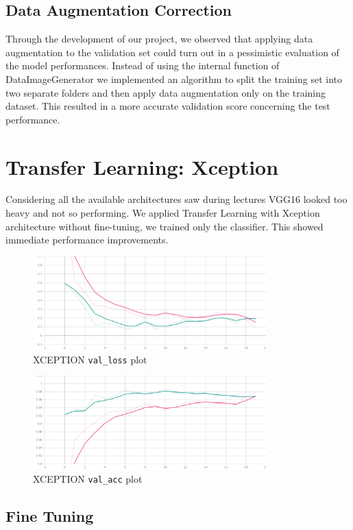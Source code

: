 \documentclass{article}
\begin{document}
		\subsection{Data Augmentation Correction}
			Through the development of our project, we observed that applying data augmentation to the validation set could turn out in a pessimistic evaluation of the model performances. Instead of using the internal function of DataImageGenerator we implemented an algorithm to split the training set into two separate folders and then apply data augmentation only on the training dataset. This resulted in a more accurate validation score concerning the test performance.
			
	\section{Transfer Learning: Xception}
		Considering all the available architectures saw during lectures VGG16 looked too heavy and not so performing. We applied Transfer Learning with Xception architecture without fine-tuning, we trained only the classifier. This showed immediate performance improvements.
		
		\begin{figure}[H]
			\centering
			\includegraphics[width=9cm, keepaspectratio]{XCEPTION_LOSS.jpg}
			\caption{XCEPTION \texttt{val\_loss} plot}
		\end{figure}
	
		\begin{figure}[H]
			\centering
			\includegraphics[width=9cm, keepaspectratio]{XCEPTION_ACC.jpg}
			\caption{XCEPTION \texttt{val\_acc} plot}
		\end{figure}
		
		\subsection{Fine Tuning}
		
\end{document}

